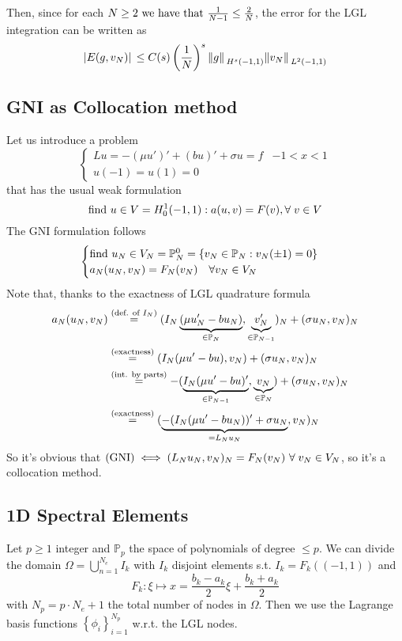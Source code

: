 Then, since for each \(N\geq 2 \text{ we have that }\frac{1}{N-1} \leq \frac{2}{N}\), the error for the LGL integration can be written as 
\[
    \abs*{E(g,v_N)} \leq C(s)\left(\frac{1}{N}\right)^s \norm*{g}_{H^s(-1,1)} \norm*{v_N}_{L^2(-1,1)}
\]

\subsection{GNI as Collocation method}
Let us introduce a problem 
\[
    \begin{cases}
        Lu = -(\mu u')' + (bu)' + \sigma u =  f & -1 < x < 1 \\
        u(-1) = u(1) = 0
    \end{cases}
\]
that has the usual weak formulation 
\[
    \text{find } u \in V = H^1_0(-1,1): a(u,v) = F(v), \forall \; v \in V
\]
The GNI formulation follows 
\[
    \begin{cases}
        \text{find } u_N \in V_N = \mathbb{P}^0_N = \left\{v_N  \in \mathbb{P}_N : v_N(\pm 1) = 0\right\} \\
        a_N(u_N, v_N) = F_N(v_N) \quad \forall v_N \in V_N
    \end{cases}
\]
Note that, thanks to the exactness of LGL quadrature formula 
\begin{align*}
    a_N(u_N, v_N) &\overset{(\text{def. of }I_N)}{=} (I_N\underbrace{(\mu u'_N - bu_N)}_{\in \mathbb{P}_N}, \underbrace{v'_N}_{\in \mathbb{P}_{N-1}})_N + (\sigma u_N, v_N)_N \\
    &\overset{(\text{exactness})}{=} (I_N(\mu u' - b u), v_N) + (\sigma u_N, v_N)_N \\
    &\overset{(\text{int. by parts})}{=} -(\underbrace{I_N(\mu u' - b u)'}_{\in \mathbb{P}_{N-1}}, \underbrace{v_N}_{\in \mathbb{P}_N}) + (\sigma u_N, v_N)_N \\
    &\overset{(\text{exactness})}{=} (\underbrace{-(I_N(\mu u' - b u_N))' + \sigma u_N}_{= L_Nu_N}, v_N)_N
\end{align*}
So it's obvious that \((\txt{GNI}) \iff (L_Nu_N, v_N)_N = F_N(v_N) \ \forall \; v_N \in V_N\), so it's a collocation method.
\subsection{1D Spectral Elements}
Let \(p \geq 1\) integer and \(\mathbb{P}_p\) the space of polynomials of degree \(\leq p\). We can divide the domain \(\Omega = \bigcup_{n=1}^{N_e} I_k\) with \(I_k\) disjoint elements s.t. \(I_k = F_k ((-1,1))\) and 
\[
    F_k : \xi \mapsto x = \frac{b_k -a_k}{2}\xi + \frac{b_k+a_k}{2}
\]
with \(N_p = p\cdot N_e +1\) the total number of nodes in \(\Omega\). 
Then we use the Lagrange basis functions \(\left\{ \phi_i\right\}_{i=1}^{N_p}\) w.r.t. the LGL nodes.

